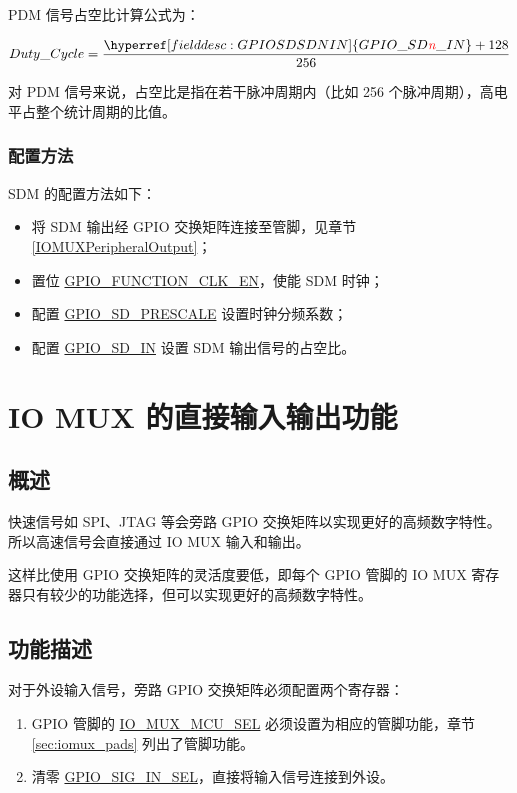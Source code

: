 \documentclass[main\_\_CN.tex]{subfiles}
\begin{document}
PDM 信号占空比计算公式为：

    \[
    Duty\_Cycle=\frac{\hyperref[fielddesc:GPIOSDSDNIN]{GPIO\_SD\regindex{n}\_IN} + 128} {256}
    \]

\begin{tiplisting}
对 PDM 信号来说，占空比是指在若干脉冲周期内（比如 256 个脉冲周期），高电平占整个统计周期的比值。
\end{tiplisting}

\subsubsection{配置方法}

SDM 的配置方法如下：

\begin{itemize}
    \item 将 SDM 输出经 GPIO 交换矩阵连接至管脚，见章节 \ref{IOMUXPeripheralOutput}；
    \item 置位 \hyperref[fielddesc:GPIOSDFUNCTIONCLKEN]{GPIO\_FUNCTION\_CLK\_EN}，使能 SDM 时钟；
    \item 配置 \hyperref[fielddesc:GPIOSDSDNPRESCALE]{GPIO\_SD\_PRESCALE} 设置时钟分频系数；
    \item 配置 \hyperref[fielddesc:GPIOSDSDNIN]{GPIO\_SD\_IN} 设置 SDM 输出信号的占空比。
\end{itemize}



\section{IO MUX 的直接输入输出功能}

\subsection{概述}

快速信号如 SPI、JTAG 等会旁路 GPIO 交换矩阵以实现更好的高频数字特性。所以高速信号会直接通过 IO MUX 输入和输出。

这样比使用 GPIO 交换矩阵的灵活度要低，即每个 GPIO 管脚的 IO MUX 寄存器只有较少的功能选择，但可以实现更好的高频数字特性。

\subsection{功能描述}

对于外设输入信号，旁路 GPIO 交换矩阵必须配置两个寄存器：

\begin{enumerate}
\item GPIO 管脚的 \hyperref[fielddesc:IOMUXMCUSEL]{IO\_MUX\_MCU\_SEL} 必须设置为相应的管脚功能，章节 \ref{sec:iomux_pads} 列出了管脚功能。
\item 清零 \hyperref[fielddesc:GPIOSIGNINSEL]{GPIO\_SIG\_IN\_SEL}，直接将输入信号连接到外设。
\end{enumerate}
\end{document}
